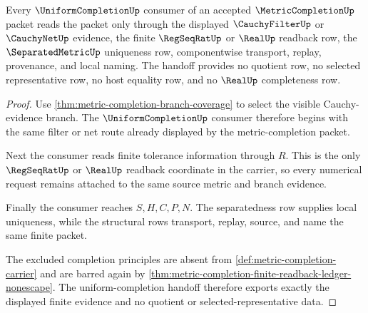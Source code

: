 \begin{theorem}
\label{thm:metric-completion-uniform-completion-handoff}
Every $\UniformCompletionUp$ consumer of an accepted $\MetricCompletionUp$ packet reads the packet only through the displayed $\CauchyFilterUp$ or $\CauchyNetUp$ evidence, the finite $\RegSeqRatUp$ or $\RealUp$ readback row, the $\SeparatedMetricUp$ uniqueness row, componentwise transport, replay, provenance, and local naming. The handoff provides no quotient row, no selected representative row, no host equality row, and no $\RealUp$ completeness row.
\end{theorem}
\begin{proof}
Use \autoref{thm:metric-completion-branch-coverage} to select the visible Cauchy-evidence branch. The $\UniformCompletionUp$ consumer therefore begins with the same filter or net route already displayed by the metric-completion packet.

Next the consumer reads finite tolerance information through $R$. This is the only $\RegSeqRatUp$ or $\RealUp$ readback coordinate in the carrier, so every numerical request remains attached to the same source metric and branch evidence.

Finally the consumer reaches $S,H,C,P,N$. The separatedness row supplies local uniqueness, while the structural rows transport, replay, source, and name the same finite packet.

The excluded completion principles are absent from \autoref{def:metric-completion-carrier} and are barred again by \autoref{thm:metric-completion-finite-readback-ledger-nonescape}. The uniform-completion handoff therefore exports exactly the displayed finite evidence and no quotient or selected-representative data.
\end{proof}

